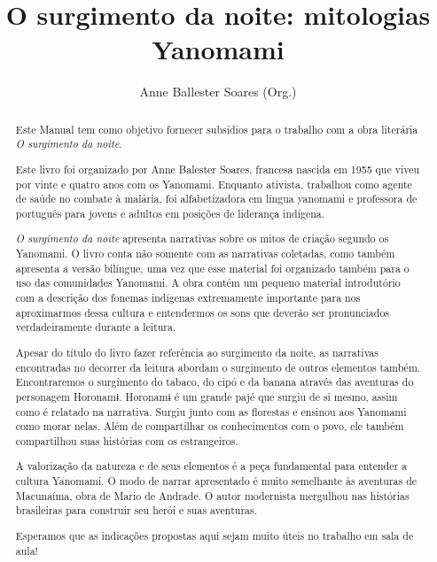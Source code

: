 \documentclass[12pt]{extarticle}
\begin{document}
\newcommand{\AutorLivro}{Anne Ballester Soares (Org.)}
\newcommand{\TituloLivro}{O surgimento da noite: mitologias Yanomami}
\newcommand{\Tema}{Ficção, mistério e fantasia}
\newcommand{\Genero}{Mitologia indígena}
\newcommand{\imagemCapa}{./images/PNLD0029-01.png}
\newcommand{\issnppub}{978-65-86941-35-7}
\newcommand{\issnepub}{978-65-86941-36-4}
\newcommand{\colaborador}{Alessandra Cabral, Vicente Castro, Bruno Gradella}


\title{\TituloLivro}
\author{\AutorLivro}
\def\authornotes{\colaborador}

\date{}
\maketitle




\begin{abstract}
Este Manual tem como objetivo fornecer subsídios para o trabalho com a
obra literária \emph{O surgimento da noite}.

Este livro foi organizado por Anne Balester Soares, francesa nascida em 1955 
que viveu por vinte e quatro anos com os Yanomami. Enquanto ativista, trabalhou como agente 
de saúde no combate à malária, foi alfabetizadora em língua yanomami e professora 
de português para jovens e adultos em posições de liderança indígena.

\emph{O surgimento da noite} apresenta narrativas sobre os mitos de criação segundo 
os Yanomami. O livro conta não somente com as narrativas coletadas, como também 
apresenta a versão bilíngue, uma vez que esse material foi organizado também para o uso 
das comunidades Yanomami. A obra contém um pequeno material introdutório 
com a descrição dos fonemas indígenas extremamente importante para nos 
aproximarmos dessa cultura e entendermos os sons que deverão ser pronunciados 
verdadeiramente durante a leitura. 

Apesar do título do livro fazer referência ao surgimento da noite, as narrativas
encontradas no decorrer da leitura abordam o surgimento de outros elementos
também. Encontraremos o surgimento do tabaco, do cipó e da banana através
das aventuras do personagem Horonamɨ. Horonamɨ é um grande pajé que surgiu de si mesmo, 
assim como é relatado na narrativa. Surgiu junto com as florestas e ensinou aos Yanomami 
como morar nelas. Além de compartilhar os conhecimentos com o povo, ele também
compartilhou suas histórias com os estrangeiros.

A valorização da natureza e de seus elementos é a peça fundamental para entender 
a cultura Yanomami. O modo de narrar apresentado é muito semelhante às aventuras 
de Macunaíma, obra de Mario de Andrade. O autor modernista mergulhou nas histórias 
brasileiras para construir seu herói e suas aventuras.

Esperamos que as indicações propostas aqui sejam muito úteis no trabalho em
sala de aula! 


\end{abstract}
\end{document}
